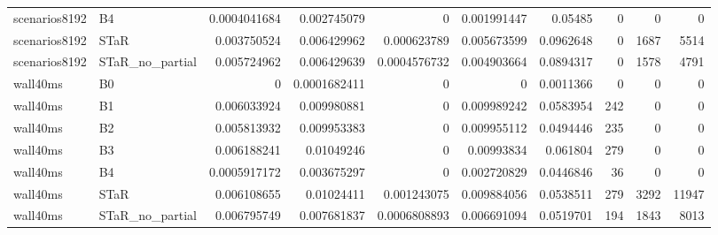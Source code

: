 \begin{tabular}{llrrrrrrrr}
scenarios8192 & B4 & 0.0004041684 & 0.002745079 & 0 & 0.001991447 & 0.05485 & 0 & 0 & 0 \\
scenarios8192 & STaR & 0.003750524 & 0.006429962 & 0.000623789 & 0.005673599 & 0.0962648 & 0 & 1687 & 5514 \\
scenarios8192 & STaR\_no\_partial & 0.005724962 & 0.006429639 & 0.0004576732 & 0.004903664 & 0.0894317 & 0 & 1578 & 4791 \\
wall40ms & B0 & 0 & 0.0001682411 & 0 & 0 & 0.0011366 & 0 & 0 & 0 \\
wall40ms & B1 & 0.006033924 & 0.009980881 & 0 & 0.009989242 & 0.0583954 & 242 & 0 & 0 \\
wall40ms & B2 & 0.005813932 & 0.009953383 & 0 & 0.009955112 & 0.0494446 & 235 & 0 & 0 \\
wall40ms & B3 & 0.006188241 & 0.01049246 & 0 & 0.00993834 & 0.061804 & 279 & 0 & 0 \\
wall40ms & B4 & 0.0005917172 & 0.003675297 & 0 & 0.002720829 & 0.0446846 & 36 & 0 & 0 \\
wall40ms & STaR & 0.006108655 & 0.01024411 & 0.001243075 & 0.009884056 & 0.0538511 & 279 & 3292 & 11947 \\
wall40ms & STaR\_no\_partial & 0.006795749 & 0.007681837 & 0.0006808893 & 0.006691094 & 0.0519701 & 194 & 1843 & 8013 \\
\hline
\end{tabular}
